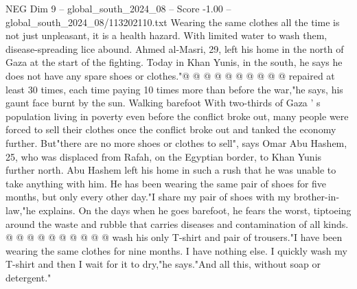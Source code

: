 \begin{textsample}{NEG Dim 9 – global\_south\_2024\_08 – Score -1.00 – global\_south\_2024\_08/113202110.txt}
Wearing the same clothes all the time is not just unpleasant, it is a health hazard.
With limited water to wash them, disease-spreading lice abound.
Ahmed al-Masri, 29, left his home in the north of Gaza at the start of the fighting.
Today in Khan Yunis, in the south, he says he does not have any spare shoes or clothes."@ @ @ @ @ @ @ @ @ @ repaired at least 30 times, each time paying 10 times more than before the war,"he says, his gaunt face burnt by the sun.
Walking barefoot With two-thirds of Gaza ' s population living in poverty even before the conflict broke out, many people were forced to sell their clothes once the conflict broke out and tanked the economy further.
But"there are no more shoes or clothes to sell", says Omar Abu Hashem, 25, who was displaced from Rafah, on the Egyptian border, to Khan Yunis further north.
Abu Hashem left his home in such a rush that he was unable to take anything with him.
He has been wearing the same pair of shoes for five months, but only every other day."I share my pair of shoes with my brother-in-law,"he explains.
On the days when he goes barefoot, he fears the worst, tiptoeing around the waste and rubble that carries diseases and contamination of all kinds. @ @ @ @ @ @ @ @ @ @ wash his only T-shirt and pair of trousers."I have been wearing the same clothes for nine months.
I have nothing else.
I quickly wash my T-shirt and then I wait for it to dry,"he says."And all this, without soap or detergent."

\end{textsample}
